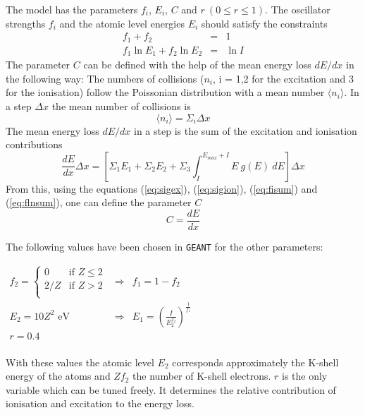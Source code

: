 The model has the parameters $f_i$, $E_i$, $C$ and $r ~(0\leq r\leq 1)$.
The oscillator strengths $f_i$ and the atomic level energies $E_i$ should
satisfy the constraints
\begin{eqnarray}
f_1 + f_2 & = & 1  \label{eq:fisum}\\
f_1 \ln E_1 + f_2 \ln E_2 & = & \ln I \label{eq:flnsum}
\end{eqnarray}
The parameter $C$ can be defined with the help of the
mean energy loss $dE/dx$ in the following way:
The numbers of collisions ($n_i$, i = 1,2 for the excitation and 3 for
the ionisation) follow the Poissonian distribution with a mean
number $ \langle n_i \rangle $. In a step $\Delta x$ the mean number
of collisions is
\begin{equation}
\langle n_i \rangle = \Sigma_i \Delta x
\end{equation}
The mean energy loss $dE/dx$ in a step is the sum of the excitation
and ionisation contributions
\begin{equation}
\frac{dE}{dx} \Delta x = \left[ \Sigma_1 E_1 + \Sigma_2 E_2 +
                          \Sigma_3 \int_{I}^{E_{max}+I} E~g(E)~dE \right]
                         \Delta x
\end{equation}
From this, using the  equations (\ref{eq:sigex}), (\ref{eq:sigion}),
(\ref{eq:fisum}) and (\ref{eq:flnsum}),
one can define the parameter $C$
\begin{equation}
C = \frac{dE}{dx}
\end{equation}

The following values have been chosen in {\tt GEANT} for the other
parameters:

$ \begin{array}{lcl}
f_2 = \left\{ \begin{array}{ll}
             0   & \mbox{if $Z \leq 2$} \\
             2/Z & \mbox{if $Z > 2$} \\
             \end{array} \right.    & \Rightarrow & f_1 = 1 - f_2 \\
E_2 = 10 Z^2 \mbox{ eV}  & \Rightarrow & E_1 = \left(\frac{I}{E_{2}^{f_2}}
                                              \right)^{\frac{1}{f_1}} \\
r  = 0.4 & & \\
\end{array} $

\noindent With these values the atomic level $E_2$ corresponds approximately
the K-shell energy of the atoms and $Zf_2$ the number of K-shell
electrons. $r$ is the only variable which can be tuned freely. It
determines the relative contribution of ionisation and
excitation to the energy loss.

